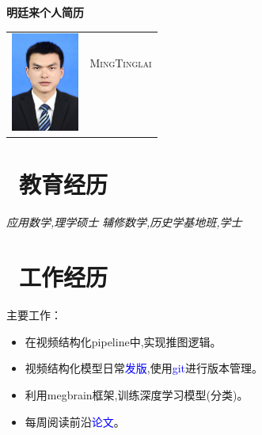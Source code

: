 \documentclass{resume}
\begin{document}
\begin{center} 
\Large\textbf{明廷来个人简历}
\end{center}

{
\Large{
  \begin{tabu}{ c l }
    & \scshape{MingTinglai} \\ 
    & \\ 
    & \\
    & 
  \end{tabu}
}
}

\section{\textcolor{blue}\faGraduationCap\ 教育经历}
\textit{应用数学,理学硕士}
\textit{辅修数学,历史学基地班,学士} 

\section{\textcolor{blue}\faUsers\ 工作经历}
主要工作：
\begin{itemize}
  \item 在视频结构化pipeline中,实现推图逻辑。
  \item 视频结构化模型日常\textcolor{blue}{发版},使用\textcolor{blue}{git}进行版本管理。
  \item 利用megbrain框架,训练深度学习模型(分类)。%
  \item 每周阅读前沿\textcolor{blue}{论文}。
\end{itemize}
\end{document}

